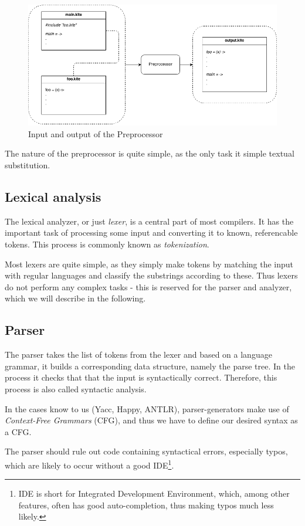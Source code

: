\begin{figure}[H]
  \label{fig:preprocessor}
  \center
  \includegraphics[scale=0.45]{images/preprocessor.png}
  \caption{Input and output of the Preprocessor}
\end{figure}

The nature of the preprocessor is quite simple, as the only task it
simple textual substitution.

\subsection{Lexical analysis}
The lexical analyzer, or just \emph{lexer}, is a central part of most
compilers. It has the important task of processing some input and
converting it to known, referencable tokens. This process is commonly
known as \emph{tokenization}.

Most lexers are quite simple, as they simply make tokens by matching the input with regular languages and classify the substrings according to these. Thus lexers do not perform any complex tasks - this is reserved for the parser and analyzer, which we will describe in the following.


\subsection{Parser}
The parser takes the list of tokens from the lexer and based on a
language grammar, it builds a corresponding data structure, namely the
parse tree. In the process it checks that that the input is
syntactically correct. Therefore, this process is also called syntactic
analysis.

In the cases know to us (Yacc, Happy, ANTLR), parser-generators make use of \emph{Context-Free Grammars} (CFG), and thus we have to define our desired syntax as a CFG.

The parser should rule out code containing syntactical errors, especially typos, which are likely to occur without a good IDE\footnote{IDE is short for Integrated Development Environment, which, among other features, often has good auto-completion, thus making typos much less likely.}.

